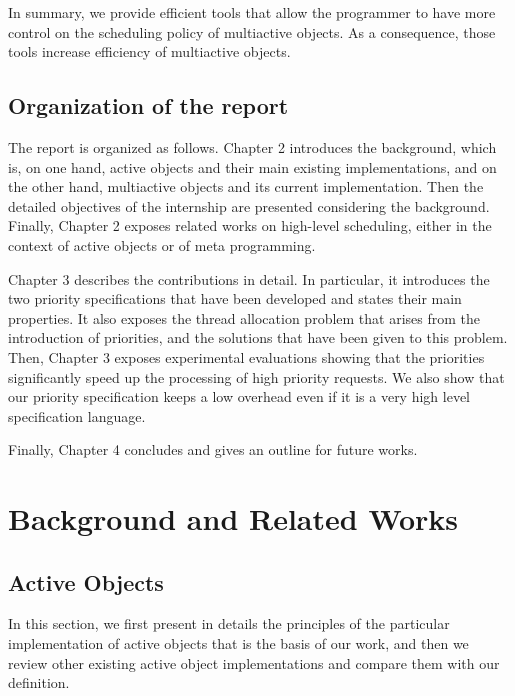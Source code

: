 \documentclass[11pt]{report}
\begin{document}
In summary, we provide efficient tools that allow the programmer to have more control on the scheduling policy of multiactive objects. As a consequence, those tools increase efficiency of multiactive objects.


\section{Organization of the report}
The report is organized as follows. Chapter 2 introduces the background, which is, on one hand, active objects and their main existing implementations, and on the other hand, multiactive objects and its current implementation. Then the detailed objectives of the internship are presented considering the background. Finally, Chapter 2 exposes related works on high-level scheduling, either in the context of active objects or of meta programming.

Chapter 3 describes the contributions in detail. In particular, it introduces the two priority specifications that have been developed and states their main properties. It also exposes the thread allocation problem that arises from the introduction of priorities, and the solutions that have been given to this problem. Then, Chapter 3 exposes experimental evaluations showing that the priorities significantly speed up the processing of high priority requests. We also show that our priority specification keeps a low overhead even if  it is a very high level specification language.

Finally, Chapter 4 concludes and gives an outline for future works.

\chapter{Background and Related Works}
\section{Active Objects}
In this section, we first present in details the principles of the particular implementation of active objects that is the basis of our work, and then we review other existing active object implementations and compare them with our definition.
\end{document}
